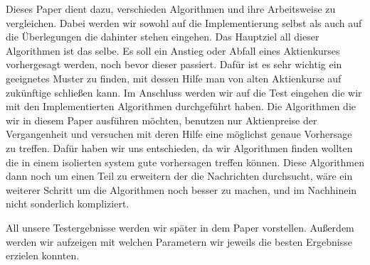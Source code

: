 \documentclass[12pt]{article} %
\begin{document}
Dieses Paper dient dazu, verschieden Algorithmen und ihre Arbeitsweise zu vergleichen. Dabei werden wir sowohl auf die Implementierung selbst als auch auf die Überlegungen die dahinter stehen eingehen. Das Hauptziel all dieser Algorithmen ist das selbe. Es soll ein Anstieg oder Abfall eines Aktienkurses vorhergesagt werden, noch bevor dieser passiert. Dafür ist es sehr wichtig ein geeignetes Muster zu finden, mit dessen Hilfe man von alten Aktienkurse auf zukünftige schließen kann. Im Anschluss werden wir auf die Test eingehen die wir mit den Implementierten Algorithmen durchgeführt haben. Die Algorithmen die wir in diesem Paper ausführen möchten, benutzen nur Aktienpreise der Vergangenheit und versuchen mit deren Hilfe eine möglichst genaue Vorhersage zu treffen. Dafür haben wir uns entschieden, da wir Algorithmen finden wollten die in einem isolierten system gute vorhersagen treffen können. Diese Algorithmen dann noch um einen Teil zu erweitern der die Nachrichten durchsucht, wäre ein weiterer Schritt um die Algorithmen noch besser zu machen, und im Nachhinein nicht sonderlich kompliziert.

All unsere Testergebnisse werden wir später in dem Paper vorstellen. Außerdem werden wir aufzeigen mit welchen Parametern wir jeweils die besten Ergebnisse erzielen konnten.







\end{document}
